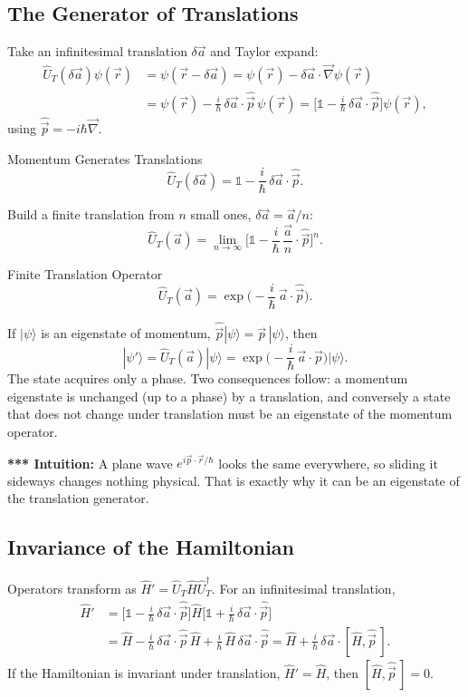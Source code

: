\documentclass[11pt,a4paper]{article}
\begin{document}
\subsection{The Generator of Translations}
Take an infinitesimal translation $\delta\vec a$ and Taylor expand:
\begin{align*}
\hat U_T(\delta\vec a)\psi(\vec r)&=\psi(\vec r-\delta\vec a)=\psi(\vec r)-\delta\vec a\cdot\vec\nabla\psi(\vec r)\\
&=\psi(\vec r)-\frac{i}{\hbar}\,\delta\vec a\cdot\hat{\vec p}\,\psi(\vec r)=\Big[\mathbb 1-\frac i\hbar\,\delta\vec a\cdot\hat{\vec p}\Big]\psi(\vec r),
\end{align*}
using $\hat{\vec p}=-i\hbar\vec\nabla$.

\begin{thm}{Momentum Generates Translations}
\[
\hat U_T(\delta\vec a)=\mathbb 1-\frac i\hbar\,\delta\vec a\cdot\hat{\vec p}.
\]
\end{thm}

Build a finite translation from $n$ small ones, $\delta\vec a=\vec a/n$:
\[
\hat U_T(\vec a)=\lim_{n\to\infty}\Big[\mathbb 1-\frac i\hbar\,\frac{\vec a}{n}\cdot\hat{\vec p}\Big]^n.
\]

\begin{thm}{Finite Translation Operator}
\[
\hat U_T(\vec a)=\exp\!\Big(-\frac i\hbar\,\vec a\cdot\hat{\vec p}\Big).
\]
\end{thm}

If $|\psi\rangle$ is an eigenstate of momentum, $\hat{\vec p}|\psi\rangle=\vec p\,|\psi\rangle$, then
\[
|\psi'\rangle=\hat U_T(\vec a)|\psi\rangle=\exp\!\Big(-\frac i\hbar\,\vec a\cdot\vec p\Big)|\psi\rangle .
\]
The state acquires only a phase. Two consequences follow: a momentum eigenstate is unchanged (up to a phase) by a translation, and conversely a state that does not change under translation must be an eigenstate of the momentum operator.

\textbf{*** Intuition:} A plane wave $e^{i\vec p\cdot\vec r/\hbar}$ looks the same everywhere, so sliding it sideways changes nothing physical. That is exactly why it can be an eigenstate of the translation generator.

\subsection{Invariance of the Hamiltonian}
Operators transform as $\hat H'=\hat U_T\hat H\hat U_T^\dagger$. For an infinitesimal translation,
\begin{align*}
\hat H'&=\Big[\mathbb 1-\frac i\hbar\,\delta\vec a\cdot\hat{\vec p}\Big]\hat H\Big[\mathbb 1+\frac i\hbar\,\delta\vec a\cdot\hat{\vec p}\Big]\\
&=\hat H-\frac i\hbar\,\delta\vec a\cdot\hat{\vec p}\,\hat H+\frac i\hbar\,\hat H\,\delta\vec a\cdot\hat{\vec p}
=\hat H+\frac i\hbar\,\delta\vec a\cdot[\hat H,\hat{\vec p}\,].
\end{align*}
If the Hamiltonian is invariant under translation, $\hat H'=\hat H$, then $[\hat H,\hat{\vec p}\,]=0$.
\end{document}
